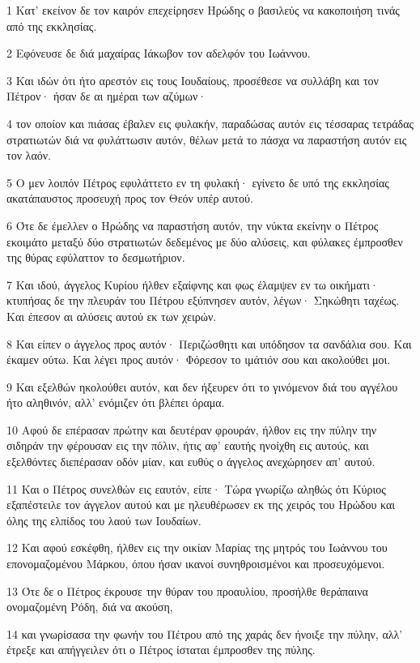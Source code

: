 \par 1 Κατ' εκείνον δε τον καιρόν επεχείρησεν Ηρώδης ο βασιλεύς να κακοποιήση τινάς από της εκκλησίας.
\par 2 Εφόνευσε δε διά μαχαίρας Ιάκωβον τον αδελφόν του Ιωάννου.
\par 3 Και ιδών ότι ήτο αρεστόν εις τους Ιουδαίους, προσέθεσε να συλλάβη και τον Πέτρον· ήσαν δε αι ημέραι των αζύμων·
\par 4 τον οποίον και πιάσας έβαλεν εις φυλακήν, παραδώσας αυτόν εις τέσσαρας τετράδας στρατιωτών διά να φυλάττωσιν αυτόν, θέλων μετά το πάσχα να παραστήση αυτόν εις τον λαόν.
\par 5 Ο μεν λοιπόν Πέτρος εφυλάττετο εν τη φυλακή· εγίνετο δε υπό της εκκλησίας ακατάπαυστος προσευχή προς τον Θεόν υπέρ αυτού.
\par 6 Ότε δε έμελλεν ο Ηρώδης να παραστήση αυτόν, την νύκτα εκείνην ο Πέτρος εκοιμάτο μεταξύ δύο στρατιωτών δεδεμένος με δύο αλύσεις, και φύλακες έμπροσθεν της θύρας εφύλαττον το δεσμωτήριον.
\par 7 Και ιδού, άγγελος Κυρίου ήλθεν εξαίφνης και φως έλαμψεν εν τω οικήματι· κτυπήσας δε την πλευράν του Πέτρου εξύπνησεν αυτόν, λέγων· Σηκώθητι ταχέως. Και έπεσον αι αλύσεις αυτού εκ των χειρών.
\par 8 Και είπεν ο άγγελος προς αυτόν· Περιζώσθητι και υπόδησον τα σανδάλια σου. Και έκαμεν ούτω. Και λέγει προς αυτόν· Φόρεσον το ιμάτιόν σου και ακολούθει μοι.
\par 9 Και εξελθών ηκολούθει αυτόν, και δεν ήξευρεν ότι το γινόμενον διά του αγγέλου ήτο αληθινόν, αλλ' ενόμιζεν ότι βλέπει όραμα.
\par 10 Αφού δε επέρασαν πρώτην και δευτέραν φρουράν, ήλθον εις την πύλην την σιδηράν την φέρουσαν εις την πόλιν, ήτις αφ' εαυτής ηνοίχθη εις αυτούς, και εξελθόντες διεπέρασαν οδόν μίαν, και ευθύς ο άγγελος ανεχώρησεν απ' αυτού.
\par 11 Και ο Πέτρος συνελθών εις εαυτόν, είπε· Τώρα γνωρίζω αληθώς ότι Κύριος εξαπέστειλε τον άγγελον αυτού και με ηλευθέρωσεν εκ της χειρός του Ηρώδου και όλης της ελπίδος του λαού των Ιουδαίων.
\par 12 Και αφού εσκέφθη, ήλθεν εις την οικίαν Μαρίας της μητρός του Ιωάννου του επονομαζομένου Μάρκου, όπου ήσαν ικανοί συνηθροισμένοι και προσευχόμενοι.
\par 13 Ότε δε ο Πέτρος έκρουσε την θύραν του προαυλίου, προσήλθε θεράπαινα ονομαζομένη Ρόδη, διά να ακούση,
\par 14 και γνωρίσασα την φωνήν του Πέτρου από της χαράς δεν ήνοιξε την πύλην, αλλ' έτρεξε και απήγγειλεν ότι ο Πέτρος ίσταται έμπροσθεν της πύλης.
